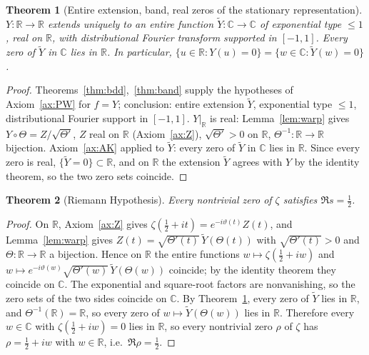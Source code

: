 \documentclass[11pt,a4paper]{article}
\theoremstyle{plain}
\newtheorem{theorem}{Theorem}
\theoremstyle{definition}
\newcommand{\R}{\mathbb{R}}
\newcommand{\C}{\mathbb{C}}
\begin{document}
\begin{theorem}[Entire extension, band, real zeros of the stationary representation]\label{thm:ent}
$Y:\R\to\R$ extends uniquely to an entire function $\widetilde Y:\C\to\C$ of exponential type $\le 1$, real on $\R$, with distributional Fourier transform supported in $[-1,1]$. Every zero of $\widetilde Y$ in $\C$ lies in $\R$. In particular, $\{u\in\R:Y(u)=0\}=\{w\in\C:\widetilde Y(w)=0\}$.
\end{theorem}
\begin{proof}
Theorems~\ref{thm:bdd},~\ref{thm:band} supply the hypotheses of Axiom~\ref{ax:PW} for $f=Y$; conclusion: entire extension $\widetilde Y$, exponential type $\le 1$, distributional Fourier support in $[-1,1]$. $Y|_\R$ is real: Lemma~\ref{lem:warp} gives $Y\circ\Theta=Z/\sqrt{\Theta'}$, $Z$ real on $\R$ (Axiom~\ref{ax:Z}), $\sqrt{\Theta'}>0$ on $\R$, $\Theta^{-1}:\R\to\R$ bijection. Axiom~\ref{ax:AK} applied to $\widetilde Y$: every zero of $\widetilde Y$ in $\C$ lies in $\R$. Since every zero is real, $\{\widetilde Y=0\}\subset\R$, and on $\R$ the extension $\widetilde Y$ agrees with $Y$ by the identity theorem, so the two zero sets coincide.
\end{proof}

\begin{theorem}[Riemann Hypothesis]\label{thm:RH}
Every nontrivial zero of $\zeta$ satisfies $\Re s=\tfrac12$.
\end{theorem}
\begin{proof}
On $\R$, Axiom~\ref{ax:Z} gives $\zeta(\tfrac12+it)=e^{-i\vartheta(t)}Z(t)$, and Lemma~\ref{lem:warp} gives $Z(t)=\sqrt{\Theta'(t)}\,\widetilde Y(\Theta(t))$ with $\sqrt{\Theta'(t)}>0$ and $\Theta:\R\to\R$ a bijection. Hence on $\R$ the entire functions $w\mapsto\zeta(\tfrac12+iw)$ and $w\mapsto e^{-i\vartheta(w)}\sqrt{\Theta'(w)}\,\widetilde Y(\Theta(w))$ coincide; by the identity theorem they coincide on $\C$. The exponential and square-root factors are nonvanishing, so the zero sets of the two sides coincide on $\C$. By Theorem~\ref{thm:ent}, every zero of $\widetilde Y$ lies in $\R$, and $\Theta^{-1}(\R)=\R$, so every zero of $w\mapsto\widetilde Y(\Theta(w))$ lies in $\R$. Therefore every $w\in\C$ with $\zeta(\tfrac12+iw)=0$ lies in $\R$, so every nontrivial zero $\rho$ of $\zeta$ has $\rho=\tfrac12+iw$ with $w\in\R$, i.e.\ $\Re\rho=\tfrac12$.
\end{proof}
\end{document}
